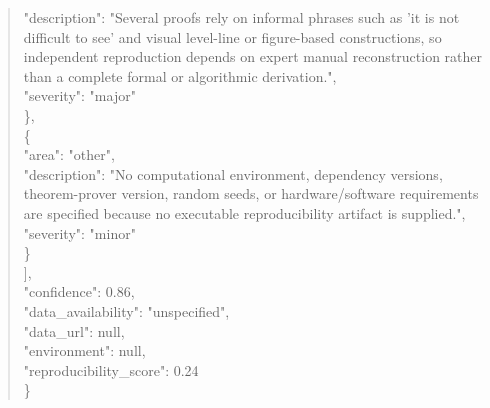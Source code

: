 \documentclass[11pt]{article}
\begin{document}
\begin{quote}
      "description": "Several proofs rely on informal phrases such as 'it is not difficult to see' and visual level-line or figure-based constructions, so independent reproduction depends on expert manual reconstruction rather than a complete formal or algorithmic derivation.",\\
      "severity": "major"\\
    \},\\
    \{\\
      "area": "other",\\
      "description": "No computational environment, dependency versions, theorem-prover version, random seeds, or hardware/software requirements are specified because no executable reproducibility artifact is supplied.",\\
      "severity": "minor"\\
    \}\\
  ],\\
  "confidence": 0.86,\\
  "data\_availability": "unspecified",\\
  "data\_url": null,\\
  "environment": null,\\
  "reproducibility\_score": 0.24\\
\}\\
\end{quote}
\end{document}
